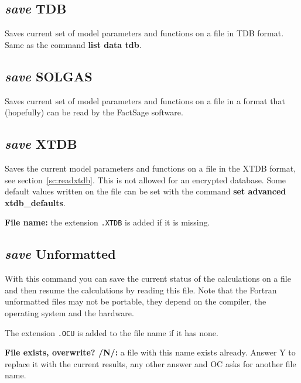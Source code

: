 \documentclass[11pt]{article}
\begin{document}
\hypertarget{Save TDB}{}
\subsection{{\em save} TDB}\label{sc:savetdb}

Saves current set of model parameters and functions on a file in TDB
format.  Same as the command {\bf list data tdb}.

\hypertarget{Save SOLGAS}{}
\subsection{{\em save} SOLGAS}

Saves current set of model parameters and functions on a file in a
format that (hopefully) can be read by the FactSage software.

\hypertarget{Save XTDB}{}
\subsection{{\em save} XTDB}

Saves the current model parameters and functions on a file in the
XTDB format, see section~\ref{sc:readxtdb}.  This is not allowed for
an encrypted database.  Some default values written on the file can
be set with the command {\bf set advanced xtdb\_defaults}.

{\bf File name:} the extension {\tt .XTDB} is added if it is missing.

\hypertarget{Save unformatted}{}
\subsection{{\em save} Unformatted}\label{sc:saveunf}

With this command you can save the current status of the calculations
on a file and then resume the calculations by reading this file.  Note
that the Fortran unformatted files may not be portable, they depend on
the compiler, the operating system and the hardware.

The extension {\tt .OCU} is added to the file name if it has none.

\hypertarget{Save overwrite}{}
{\bf File exists, overwrite? /N/:} a file with this name exists
already.  Answer Y to replace it with the current results, any other
answer and OC asks for another file name.
\end{document}
